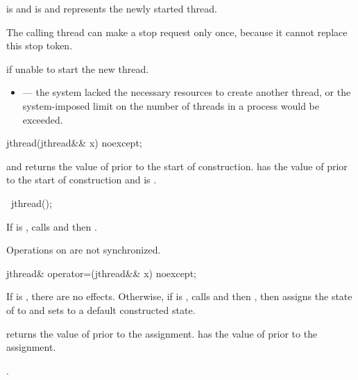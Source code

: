 \begin{itemdescr}
\pnum
\ensures
{} is 
and  is 
and  represents the newly started thread.
\begin{note}
The calling thread can make a stop request only once,
because it cannot replace this stop token.
\end{note}

\pnum
\throws
{} if unable to start the new thread.

\pnum
\errors
\begin{itemize}
\item {} --- the system lacked
the necessary resources to create another thread,
or the system-imposed limit on the number of threads in a process
would be exceeded.
\end{itemize}
\end{itemdescr}

%
\begin{itemdecl}
jthread(jthread&& x) noexcept;
\end{itemdecl}

\begin{itemdescr}
\pnum
\ensures
{}
and  returns the value of 
prior to the start of construction.
 has the value of 
prior to the start of construction
and  is .
\end{itemdescr}

%
\begin{itemdecl}
~jthread();
\end{itemdecl}

\begin{itemdescr}
\pnum
\effects
If  is ,
calls  and then .
\begin{note}
Operations on  are not synchronized.
\end{note}
\end{itemdescr}

%
\begin{itemdecl}
jthread& operator=(jthread&& x) noexcept;
\end{itemdecl}

\begin{itemdescr}
\pnum
\effects
If  is , there are no effects.
Otherwise, if  is ,
calls  and then ,
then assigns the state of  to 
and sets  to a default constructed state.

\pnum
\ensures
{} returns the value of 
prior to the assignment.
 has the value of 
prior to the assignment.

\pnum
\returns
{}.
\end{itemdescr}

